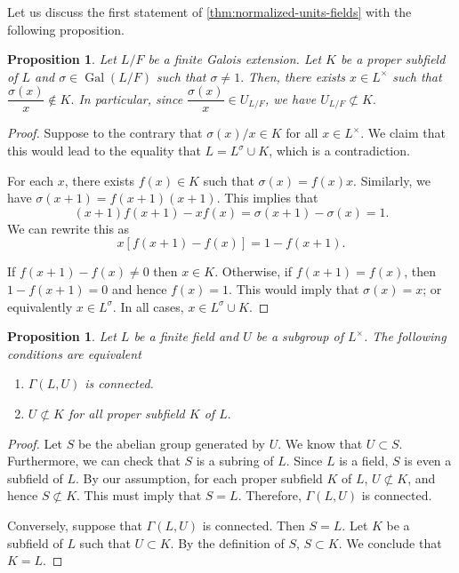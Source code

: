 \documentclass[11pt, a4paper]{amsart}
\newtheorem{prop}[thm]{Proposition}
\theoremstyle{definition}
\DeclareMathOperator{\Gal}{\text{Gal}}
\numberwithin{equation}{section}
\begin{document}
Let us discuss the first statement of \cref{thm:normalized-units-fields} with the following proposition. 

\begin{prop} \label{prop:norm-1-elements}
 Let $L/F$ be a finite Galois extension.  Let $K$ be a proper subfield of $L$ and $\sigma \in \Gal(L/F)$ such that $\sigma \neq 1.$ Then, there exists $x \in L^{\times}$ such that $\dfrac{\sigma(x)}{x} \not \in K.$ In particular, since $\dfrac{\sigma(x)}{x} \in U_{L/F}$, we have  $U_{L/F} \not \subset K.$
\end{prop}

\begin{proof}

Suppose to the contrary that $\sigma(x)/x \in K$ for all $x \in L^{\times}.$ We claim that this would lead to the equality that $L=L^{\sigma} \cup K $, which is a contradiction. 


For each $x$, there exists $f(x) \in K $ such that $\sigma(x)=f(x)x.$
   Similarly, we have $\sigma(x+1)=f(x+1) (x+1).$ This implies that 
   \[ (x+1)f(x+1)-xf(x)=\sigma(x+1)-\sigma(x)=1.\]
   We can rewrite this as 
   \[ x[f(x+1)-f(x)]=1-f(x+1).\]

   If $f(x+1)-f(x) \neq 0$ then $x \in K.$ Otherwise, if $f(x+1)=f(x)$, then $1-f(x+1)=0$ and hence $f(x)=1.$ This would imply that $\sigma(x)=x$; or equivalently $x \in L^{\sigma}.$ In all cases, $x \in L^{\sigma} \cup K$.       
\end{proof}


\begin{prop} \label{prop:u-connected}
   Let $L$ be a finite field and  $U$ be a subgroup of $L^{\times}$. The following conditions are equivalent 
    \begin{enumerate}
        \item $\Gamma(L, U)$ is connected. 
        \item $U \not \subset K$ for all proper subfield  $K$ of $L.$ 
    \end{enumerate}
\end{prop}

\begin{proof}
    Let $S$ be the abelian group generated by $U.$ We know that $U \subset S$. Furthermore, we can check that $S$ is a subring of $L.$ Since $L$ is a field, $S$ is even a subfield of $L.$ By our assumption, for each proper subfield $K$ of $L$, $U \not \subset K$, and hence  $S \not \subset K$.  This must imply that $S=L$. Therefore, $\Gamma(L, U)$ is connected. 

    Conversely, suppose that $\Gamma(L,U)$ is connected. Then $S=L$. Let $K$ be a subfield of $L$ such that $U \subset K.$ By the definition of $S$, $S  \subset K.$ We conclude that $K=L.$
\end{proof}
\end{document}
